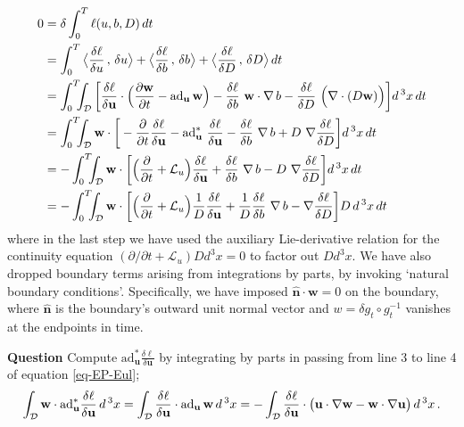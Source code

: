 \documentclass[11pt, oneside]{article}   	%
\numberwithin{equation}{section}
\theoremstyle{plain}
\theoremstyle{definition}
\theoremstyle{remark}
\newcommand{\<}{\langle}
\renewcommand{\>}{\rangle}
\newcommand{\scp}[2]{{\big\langle {#1}\, , \, {#2}\big\rangle}}
\begin{document}
\begin{align}
\begin{split}
0 &=\delta \int _0^T\ell(u, b,D)\,dt
\\
&=\int _0^T
\scp{\frac{\delta \ell}{\delta {u}}}{\delta{u}}
+ \scp{\frac{\delta \ell}{\delta b}}{\delta b}
+\scp{\frac{\delta \ell}{\delta D}}{\delta D}\,dt
%
\\
&=\int _0^T \!\!\! \int _{\cal D}\bigg[\frac{\delta \ell}{\delta \mathbf{u}}
\cdot \Big(\frac{\partial \mathbf{w}}{\partial t}
-\mathrm{ad}_{\mathbf{u}}\,\mathbf{w}\Big)
-\frac{\delta \ell}{\delta b}\ \mathbf{w}\cdot\nabla\,b
-\frac{\delta \ell}{\delta D}\ \Big(\nabla
\cdot(D\mathbf{w})\Big)\bigg]d\,^3x\,dt
%
\\
&=\int _0^T \!\!\! \int _{\cal D}\mathbf{w}\cdot
\bigg[-\frac{\partial }{\partial t}
\frac{\delta \ell}{\delta \mathbf{u}}
-\mathrm{ad}^*_{\mathbf{u}}\ \frac{\delta \ell}{\delta \mathbf{u}}
-\frac{\delta \ell}{\delta b}\ \nabla\,b
+D\ \nabla\frac{\delta \ell}{\delta D}\bigg]d\,^3x\,dt
\\
&=-\int _0^T \!\!\! \int _{\cal D}\mathbf{w}\cdot
\bigg[\Big(\frac{\partial }{\partial t}
 + \mathcal{L}_u \Big)\frac{\delta \ell}{\delta \mathbf{u}}
+\frac{\delta \ell}{\delta b}\ \nabla\,b
-D\ \nabla\frac{\delta \ell}{\delta D}\bigg]d\,^3x\,dt
\\
&=-\int _0^T \!\!\! \int _{\cal D}\mathbf{w}\cdot
\bigg[\Big(\frac{\partial }{\partial t}
 + \mathcal{L}_u \Big)\frac{1}{D}\frac{\delta \ell}{\delta \mathbf{u}}
+\frac{1}{D}\frac{\delta \ell}{\delta b}\ \nabla\,b
- \nabla\frac{\delta \ell}{\delta D}\bigg] D\, d\,^3x\,dt
\,\end{split}
\label{eq-EP-Eul}
\end{align}
%
where in the last step we have used the auxiliary Lie-derivative relation for the continuity equation
$({\partial}/{\partial t}+ \mathcal{L}_u)Dd^3x = 0$ to factor out $Dd^3x$. 
We have also dropped boundary terms arising from
integrations by parts, by invoking `natural boundary conditions'.
Specifically, we have imposed $\mathbf{\hat{n}}\cdot\mathbf{w}=0$ on the
boundary, where $\mathbf{\hat{n}}$ is the boundary's outward unit normal
vector and ${w} = \delta g_t \circ g_t^{-1}$ vanishes at
the endpoints in time.

\textbf{Question}
Compute $\mathrm{ad}^*_{\mathbf{u}} \frac{\delta \ell}{\delta \mathbf{u}} $ by integrating by parts 
in passing from line 3 to line 4 of equation \eqref{eq-EP-Eul};
\[
\int _{\cal D} \mathbf{w} \cdot \mathrm{ad}^*_{\mathbf{u}} \frac{\delta \ell}{\delta \mathbf{u}}  \,d\,^3x
=
 \int _{\cal D} \frac{\delta \ell}{\delta \mathbf{u}} \cdot {\mathrm{ad}_{\mathbf{u}}\,\mathbf{w}}  \,d\,^3x
= 
- \int _{\cal D} \frac{\delta \ell}{\delta \mathbf{u}} \cdot \big(\mathbf{u}\cdot\nabla \mathbf{w} - \mathbf{w}\cdot\nabla \mathbf{u} \big)\,d\,^3x
\,.\]
 
\end{document}
